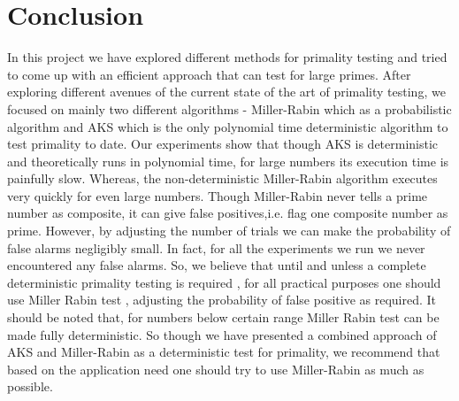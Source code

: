 \documentclass[paper=a4, fontsize=11pt]{scrartcl}	%
\numberwithin{equation}{section}		%
\numberwithin{figure}{section}		%
\numberwithin{table}{section}		%
\begin{document}
\section{Conclusion}
In this project we have explored different methods for primality testing and tried to come up with an efficient  approach that can test for large primes. After exploring different avenues of the current state of the art of primality testing, we focused on mainly two different algorithms - Miller-Rabin which as a probabilistic algorithm and AKS which is the only polynomial time deterministic algorithm to test primality to date. Our experiments show that though AKS is deterministic and theoretically runs in polynomial time, for large numbers its execution time is painfully slow. Whereas, the non-deterministic Miller-Rabin algorithm executes very quickly for even large numbers. Though Miller-Rabin never tells a prime number as composite, it can give false positives,i.e. flag one composite number as prime. However, by adjusting the number of trials we can make the probability of false alarms negligibly small. In fact, for all the experiments we run we never encountered any false alarms. So, we believe that until and unless a complete deterministic primality testing is required , for all practical purposes one should use Miller Rabin test , adjusting the probability of false positive as required. It should be noted that, for numbers below certain range Miller Rabin test can be made fully deterministic. So though we have presented a combined approach of AKS and Miller-Rabin as a deterministic test for primality, we recommend that based on the application need one should try to use Miller-Rabin as much as possible.  
%
\newpage
\end{document}
